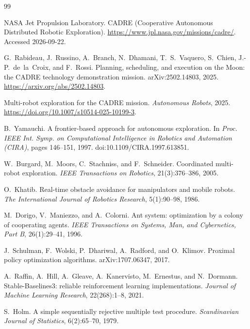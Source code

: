 \documentclass[11pt]{article}
\begin{document}
\begin{thebibliography}{99}

NASA Jet Propulsion Laboratory.
\newblock CADRE (Cooperative Autonomous Distributed Robotic Exploration).
\newblock \url{https://www.jpl.nasa.gov/missions/cadre/}. Accessed 2026-09-22.

G.~Rabideau, J.~Russino, A.~Branch, N.~Dhamani, T.~S.~Vaquero, S.~Chien,
  J.-P.~de~la~Croix, and F.~Rossi.
\newblock Planning, scheduling, and execution on the Moon: the CADRE technology
  demonstration mission.
\newblock arXiv:2502.14803, 2025. \url{https://arxiv.org/abs/2502.14803}.

Multi-robot exploration for the CADRE mission.
\newblock \emph{Autonomous Robots}, 2025.
\newblock \url{https://doi.org/10.1007/s10514-025-10199-3}.

B.~Yamauchi.
\newblock A frontier-based approach for autonomous exploration.
\newblock In \emph{Proc. IEEE Int. Symp. on Computational Intelligence in
  Robotics and Automation (CIRA)}, pages 146--151, 1997.
\newblock doi:10.1109/CIRA.1997.613851.

W.~Burgard, M.~Moors, C.~Stachniss, and F.~Schneider.
\newblock Coordinated multi-robot exploration.
\newblock \emph{IEEE Transactions on Robotics}, 21(3):376--386, 2005.

O.~Khatib.
\newblock Real-time obstacle avoidance for manipulators and mobile robots.
\newblock \emph{The International Journal of Robotics Research}, 5(1):90--98, 1986.

M.~Dorigo, V.~Maniezzo, and A.~Colorni.
\newblock Ant system: optimization by a colony of cooperating agents.
\newblock \emph{IEEE Transactions on Systems, Man, and Cybernetics, Part B},
  26(1):29--41, 1996.

J.~Schulman, F.~Wolski, P.~Dhariwal, A.~Radford, and O.~Klimov.
\newblock Proximal policy optimization algorithms.
\newblock arXiv:1707.06347, 2017.

A.~Raffin, A.~Hill, A.~Gleave, A.~Kanervisto, M.~Ernestus, and N.~Dormann.
\newblock Stable-Baselines3: reliable reinforcement learning implementations.
\newblock \emph{Journal of Machine Learning Research}, 22(268):1--8, 2021.

S.~Holm.
\newblock A simple sequentially rejective multiple test procedure.
\newblock \emph{Scandinavian Journal of Statistics}, 6(2):65--70, 1979.


\end{thebibliography}
\end{document}
